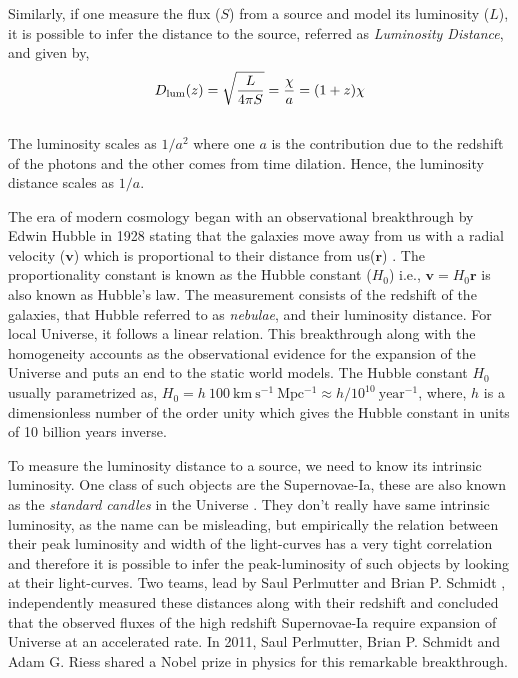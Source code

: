 Similarly, if one measure the flux ($S$) from a source and model its luminosity ($L$), it is
possible to infer the distance to the source, referred as {\it Luminosity Distance}, and 
given by,
\begin{equation}
	D_{\rm lum}(z) = \sqrt{\dfrac{L}{4\pi S}} = \dfrac{\chi}{a} = (1+z)\chi
\end{equation}
\\
The luminosity scales as $1/a^2$ where one $a$ is the contribution due to the redshift of
the photons and the other comes from time dilation. Hence, the luminosity distance scales
as $1/a$.

The era of modern cosmology began with an observational breakthrough by Edwin Hubble 
in 1928 stating that the galaxies move away from us with a radial velocity ($\mathbf{v}$) which
is proportional to their distance from us($\mathbf{r}$) \citep{1929PNAS...15..168H}. 
The proportionality constant is known
as the Hubble constant ($H_0$) i.e., $\mathbf{v}=H_0 \mathbf{r}$ is also known as Hubble's law. 
The measurement consists of the redshift of the galaxies, that Hubble referred to as
{\it nebulae}, and their luminosity distance. For local Universe, it follows
a linear relation. 
This breakthrough along with the
homogeneity accounts as the observational evidence for the expansion of the Universe and
puts an end to the static world models. The Hubble constant $H_0$ usually parametrized as, 
$H_0 = h\ 100\ \mathrm{km\ s^{-1}\ Mpc^{-1}} \approx h/10^{10}\ \mathrm{year^{-1}}$,
where, $h$ is a dimensionless number of the order unity which gives the 
Hubble constant in units of 10 billion years inverse. 

To measure the luminosity distance to a source, we need to 
know its intrinsic luminosity. One class of such objects are the Supernovae-Ia, 
these are also known as the {\it standard candles} in the Universe
\citep{1993ApJ...405L...5B,2007AIPC..924..330D}. They
don't really have same intrinsic luminosity, as the name can be misleading, but 
empirically the relation between their peak luminosity and width of the light-curves
has a very tight correlation and therefore it is possible to infer the peak-luminosity
of such objects by looking at their light-curves. Two teams, lead by Saul Perlmutter
\citep{1999ApJ...517..565P} and
Brian P. Schmidt \citep{1998ApJ...507...46S}, 
independently measured these distances along with their redshift and
concluded that the observed fluxes of the high redshift Supernovae-Ia require expansion of 
Universe at an accelerated rate. In 2011, Saul Perlmutter, 
Brian P. Schmidt and Adam G. Riess
shared a Nobel prize in physics for this remarkable breakthrough. 




